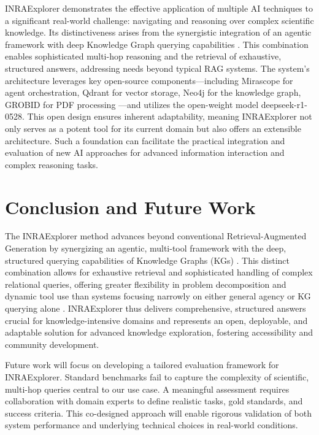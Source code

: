 \documentclass{ecai}
\begin{document}
INRAExplorer demonstrates the effective application of multiple AI techniques to a significant real-world challenge: navigating and reasoning over complex scientific knowledge. Its distinctiveness arises from the synergistic integration of an agentic framework \citep{singh2025agenticsurvey} with deep Knowledge Graph querying capabilities \citep{zhang2025surveygraphrag}. This combination enables sophisticated multi-hop reasoning and the retrieval of exhaustive, structured answers, addressing needs beyond typical RAG systems. The system's architecture leverages key open-source components—including Mirascope for agent orchestration, Qdrant for vector storage, Neo4j for the knowledge graph, GROBID for PDF processing \citep{lopez2009grobid}—and utilizes the open-weight model deepseek-r1-0528. This open design ensures inherent adaptability, meaning INRAExplorer not only serves as a potent tool for its current domain but also offers an extensible architecture. Such a foundation can facilitate the practical integration and evaluation of new AI approaches for advanced information interaction and complex reasoning tasks.


\section{Conclusion and Future Work}

The INRAExplorer method advances beyond conventional Retrieval-Augmented Generation \citep{lewis2020retrieval} by synergizing an agentic, multi-tool framework \citep{singh2025agenticsurvey} with the deep, structured querying capabilities of Knowledge Graphs (KGs) \citep{zhang2025surveygraphrag}. This distinct combination allows for exhaustive retrieval and sophisticated handling of complex relational queries, offering greater flexibility in problem decomposition and dynamic tool use \citep{yao2023react, schick2023toolformer} than systems focusing narrowly on either general agency or KG querying alone \citep{edge2024graphrag, he2024gretriever}. INRAExplorer thus delivers comprehensive, structured answers crucial for knowledge-intensive domains and represents an open, deployable, and adaptable solution for advanced knowledge exploration, fostering accessibility and community development.

Future work will focus on developing a tailored evaluation framework for INRAExplorer. Standard benchmarks fail to capture the complexity of scientific, multi-hop queries central to our use case. A meaningful assessment requires collaboration with domain experts to define realistic tasks, gold standards, and success criteria. This co-designed approach will enable rigorous validation of both system performance and underlying technical choices in real-world conditions.
\end{document}

